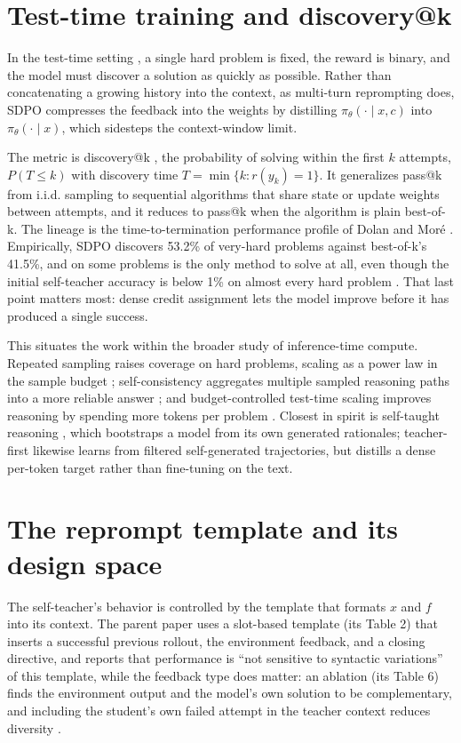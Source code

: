 \documentclass[12pt,a4paper]{report}
\begin{document}
\section{Test-time training and discovery@k}\label{test-time-training-and-discoveryk}

In the test-time setting \cite{r1}, a single hard problem is fixed, the reward is binary, and the model must discover a solution as quickly as possible. Rather than concatenating a growing history into the context, as multi-turn reprompting does, SDPO compresses the feedback into the weights by distilling \(\pi_\theta(\cdot \mid x, c)\) into \(\pi_\theta(\cdot \mid x)\), which sidesteps the context-window limit.

The metric is discovery@k \cite{r1}, the probability of solving within the first \(k\) attempts, \(P(T \le k)\) with discovery time \(T = \min\{k : r(y_k) = 1\}\). It generalizes pass@k \cite{r9} from i.i.d. sampling to sequential algorithms that share state or update weights between attempts, and it reduces to pass@k when the algorithm is plain best-of-k. The lineage is the time-to-termination performance profile of Dolan and Moré \cite{r12}. Empirically, SDPO discovers 53.2\% of very-hard problems against best-of-k's 41.5\%, and on some problems is the only method to solve at all, even though the initial self-teacher accuracy is below 1\% on almost every hard problem \cite{r1}. That last point matters most: dense credit assignment lets the model improve before it has produced a single success.

This situates the work within the broader study of inference-time compute. Repeated sampling raises coverage on hard problems, scaling as a power law in the sample budget \cite{r20}; self-consistency aggregates multiple sampled reasoning paths into a more reliable answer \cite{r18}; and budget-controlled test-time scaling improves reasoning by spending more tokens per problem \cite{r21}. Closest in spirit is self-taught reasoning \cite{r19}, which bootstraps a model from its own generated rationales; teacher-first likewise learns from filtered self-generated trajectories, but distills a dense per-token target rather than fine-tuning on the text.

\section{The reprompt template and its design space}\label{the-reprompt-template-and-its-design-space}

The self-teacher's behavior is controlled by the template that formats \(x\) and \(f\) into its context. The parent paper uses a slot-based template (its Table 2) that inserts a successful previous rollout, the environment feedback, and a closing directive, and reports that performance is ``not sensitive to syntactic variations'' of this template, while the feedback type does matter: an ablation (its Table 6) finds the environment output and the model's own solution to be complementary, and including the student's own failed attempt in the teacher context reduces diversity \cite{r1}.
\end{document}
